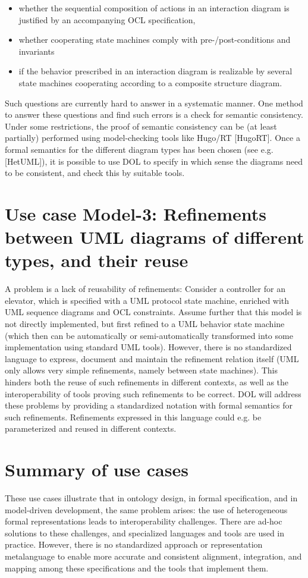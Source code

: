 \documentclass[10pt,%
\ifpretendfinal
final%
\else
draft%
\fi,
]{scrreprt}
\begin{document}
\begin{itemize}
\item	  whether the sequential composition of actions in an interaction diagram is justified by an accompanying OCL specification,
\item 	whether cooperating state machines comply with pre-/post-conditions and invariants
\item 	if the behavior prescribed in an interaction diagram is realizable by several state machines cooperating according to a composite structure diagram.

\end{itemize}
Such questions are currently hard to answer in a systematic manner. One method to answer these questions and find such errors is a check for semantic 
consistency. Under some restrictions, the proof of semantic consistency can be (at least partially) performed using model-checking tools like Hugo/RT [HugoRT]. 
Once a formal semantics for the different diagram types has been chosen (see e.g. [HetUML]), it is possible to use DOL to specify in which 
sense the diagrams need to be consistent, and check this by suitable tools.

\section{Use case Model-3: Refinements between UML diagrams of different types, and their reuse}
A problem is a lack of reusability of refinements: Consider a controller for an elevator, which is specified with a UML protocol state machine, enriched with UML 
sequence diagrams and OCL constraints. Assume further that this model is not directly implemented, but first refined to a UML behavior state machine (which then 
can be automatically or semi-automatically transformed into some implementation using standard UML tools). However, there is no standardized language to 
express, document and maintain the refinement relation itself (UML only allows very simple refinements, namely between state machines). This hinders both the 
reuse of such refinements in different contexts, as well as the interoperability of tools proving such refinements to be correct. DOL will 
address these problems by providing a standardized notation with formal semantics for such refinements. Refinements expressed in this language could e.g. be 
parameterized and reused in different contexts.

\section{Summary of use cases}
These use cases illustrate that in ontology design, in formal specification, and in model-driven development, the same problem arises: the use of heterogeneous 
formal representations leads to interoperability challenges. There are ad-hoc solutions to these challenges, and specialized languages and tools are used in 
practice. However, there is no standardized approach or representation metalanguage to enable more accurate and consistent alignment, integration, and mapping 
among these specifications and the tools that implement them.
\end{document}
